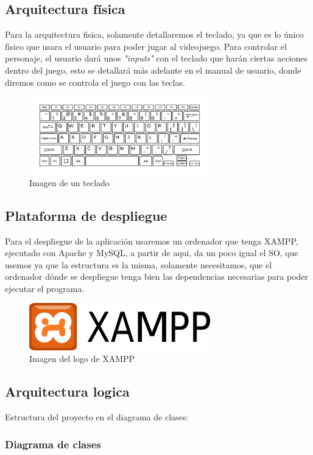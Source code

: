 \documentclass[a4paper]{article}
\begin{document}
\subsection{Arquitectura física}
Para la arquitectura fisica, solamente detallaremos el teclado, ya que es lo único físico que usara el usuario para poder jugar al videojuego.
Para controlar el personaje, el usuario dará unos \textit{"inputs"} con el teclado que harán ciertas acciones dentro del juego, esto se detallará más
adelante en el manual de usuario, donde diremos como se controla el juego con las teclas.
\begin{figure}[ht]
    \centering
    \includegraphics[width=0.7\textwidth]{Images/teclado.jpg}
    \caption{Imagen de un teclado}
    \label{fig:teclado}
\end{figure}
\subsection{Plataforma de despliegue}
Para el despliegue de la aplicación usaremos un ordenador que tenga XAMPP, ejecutado con Apache y MySQL, a partir de aqui, da un poco igual el SO, que usemos ya que la estructura es la misma, solamente necesitamos,
que el ordenador dónde se despliegue tenga bien las dependencias necesarias para poder ejecutar el programa.
\begin{figure}[ht]
    \centering
    \includegraphics[width=0.7\textwidth]{Images/Xampp_logo.png}
    \caption{Imagen del logo de XAMPP}
    \label{fig:xampplogo}
\end{figure}
\clearpage
\subsection{Arquitectura logica}
Estructura del proyecto en el diagrama de clases:
\subsubsection{Diagrama de clases}
\end{document}
